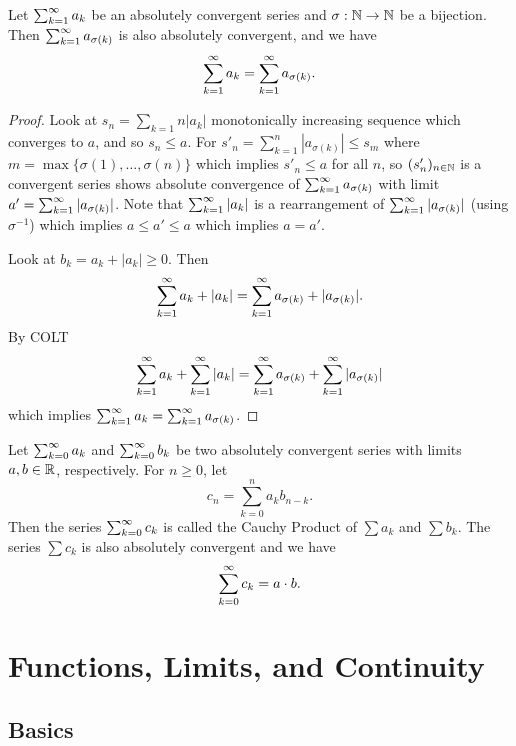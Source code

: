 \documentclass[10pt, a4paper]{article}
\newcommand{\seq}[1][x]{(#1_n)_{n \in \N}}
\begin{document}
\begin{theorem}
    Let $\infsum a_k$ be an absolutely convergent series and $\sigma : \N \rightarrow \N$ be a bijection.
    Then $\infsum a_{\sigma (k)}$ is also absolutely convergent,
    and we have
    \[
    \infsum a_k = \infsum a_{\sigma(k)}.
    \]
    \begin{proof}
        Look at $s_n = \sum_{k = 1}{n}|a_k|$ monotonically increasing sequence which converges to $a$,
        and so $s_n \leq a$.
        For $s'_n = \sum_{k = 1}^{n}|a_{\sigma(k)}| \leq s_m$ where $m = \max\{\sigma(1), \dotsc, \sigma(n)\}$ which implies $s'_n \leq a$ for all $n$,
        so $\seq[s']$ is a convergent series shows absolute convergence of $\infsum a_{\sigma(k)}$ with limit $a' = \infsum|a_{\sigma(k)}|$.
        Note that $\infsum|a_k|$ is a rearrangement of $\infsum|a_{\sigma(k)}|$
        (using $\sigma ^ {-1}$) which implies $a \leq a' \leq a$ which implies $a = a'$.

        Look at $b_k = a_k + |a_k| \geq 0$.
        Then
        \[
        \infsum a_k + |a_k| = \infsum a_{\sigma(k)} + |a_{\sigma(k)}|.
        \]
        By COLT
        \[
        \infsum a_k + \infsum|a_k| = \infsum a_{\sigma(k)} + \infsum|a_{\sigma(k)}|
        \]
        which implies $\infsum[k = 1]a_k = \infsum a_{\sigma(k)}$.
    \end{proof}
\end{theorem}

\begin{theorem}
    Let $\infsum[k = 0]a_k$ and $\infsum[k = 0]b_k$ be two absolutely convergent series with limits $a, b \in \R$,
    respectively.
    For $n \geq 0$,
    let
    \[
    c_n = \sum_{k = 0}^{n}a_kb_{n - k}.
    \]
    Then the series $\infsum[k = 0]c_k$ is called the Cauchy Product of $\sum a_k$ and $\sum b_k$.
    The series $\sum c_k$ is also absolutely convergent and we have
    \[
    \infsum[k = 0]c_k = a \cdot b.
    \]
\end{theorem}

\newpage

\section{Functions, Limits, and Continuity}

\subsection{Basics}
\end{document}
